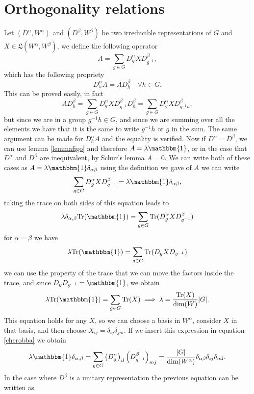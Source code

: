 \documentclass[12pt]{book}
\theoremstyle{plain}
\newcommand{\I}{\mathbbm{1}}
\theoremstyle{definition}
\theoremstyle{remark}
\begin{document}
\section{Orthogonality relations}
Let $(D^\alpha,W^\alpha)$ and $(D^\beta,W^\beta)$ be two irreducible representations of $G$ and $X\in \mathfrak{L}(W^\alpha,W^\beta)$, we define the following operator 
\[A =\sum_{g\in G} D_g^\alpha X D_{g^{-1}}^\beta,\]
which has the following propriety
\[D_h ^\alpha A = A D_h^\beta \quad \forall h\in G.\]
This can be proved easily, in fact
\[A D_h^\beta = \sum_{g\in G} D_g^\alpha X D_{g^{-1}}^\beta  D_h^\beta = \sum_{g\in G} D_g^\alpha X D_{g^{-1}h}^\beta,\]
but since we are in a group $g^{-1}h\in G$, and since we are summing over all the elements we have that it is the same to write $g^{-1}h$ or $g$ in the sum. The same argument can be made for $D_h ^\alpha A$ and the equality is verified. Now if $D^\alpha = D^\beta$, we can use lemma \ref{lemmafigo} and therefore $A = \lambda \I$, or in the case that $D^\alpha$ and $D^\beta$ are inequivalent, by Schur's lemma $A=0$. We can write both of these cases as $A = \lambda \I \delta_{\alpha\beta}$ using the definition we gave of $A$ we can write
\begin{equation}\label{cherobba}\sum_{g\in G} D_g^\alpha X D_{g^{-1}}^\beta = \lambda \I \delta_{\alpha\beta},\end{equation}
taking the trace on both sides of this equation leads to
\begin{equation}\lambda \delta_{\alpha,\beta}\text{Tr}(\I) = \sum_{g\in G} \text{Tr}(D_g^\alpha X D_{g^{-1}}^\beta)\end{equation}
for $\alpha =\beta$ we have 
\[\lambda \text{Tr}(\I) = \sum_{g\in G} \text{Tr}(D_g X D_{g^{-1}})\]
we can use the property of the trace that we can move the factors inside the trace, and since $D_g D_{g^{-1}}=\I$, we obtain
\begin{equation}\label{lambdafromtrace}\lambda \text{Tr}(\I) = \sum_{g\in G} \text{Tr}(X) \implies \lambda = \frac{\text{Tr}(X)}{\text{dim}(W)}|G|.\end{equation}
This equation holds for any $X$, so we can choose a basis in $W^\alpha$, consider $X$ in that basis, and then choose $X_{ij} = \delta_{ij}\delta_{jm}$. If we insert this expression in equation \eqref{cherobba} we obtain
\[\lambda \I \delta_{\alpha,\beta} = \sum_{g\in G}\left(D_g^\alpha\right)_{il}\left(D_{g^{-1}}^\beta\right)_{mj} = \frac{|G|}{\text{dim}(W^{\alpha})} \delta_{\alpha\beta}\delta_{ij}\delta_{ml}.\]
In the case where $D^\beta$ is a unitary representation the previous equation can be written as
\end{document}
